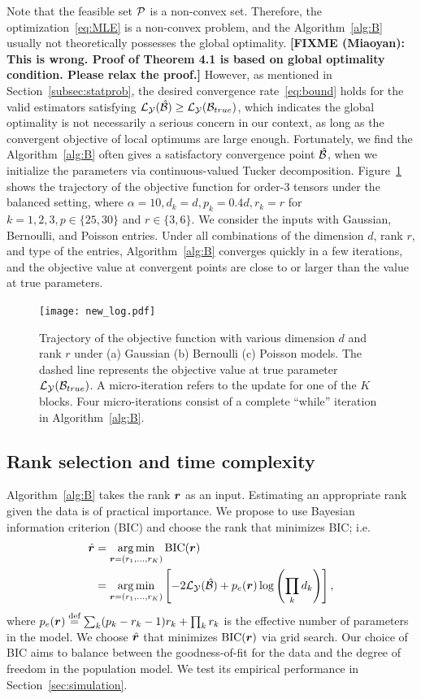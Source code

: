 \documentclass[12pt]{article}
\theoremstyle{plain}
\theoremstyle{definition}
\def\fixme#1#2{\textbf{\color{red}[FIXME (#1): #2]}}
\begin{document}
Note that the feasible set $\mathcal{P}$ is a non-convex set. Therefore, the optimization~\eqref{eq:MLE} is a non-convex problem, and the Algorithm~\ref{alg:B} usually not theoretically possesses the global optimality. \fixme{Miaoyan}{This is wrong. Proof of Theorem 4.1 is based on global optimality condition. Please relax the proof.} However, as mentioned in Section~\ref{subsec:statprob}, the desired convergence rate~\eqref{eq:bound} holds for the valid estimators satisfying $\mathcal{L}_{\mathcal{Y}} (\hat {\mathcal{B}}) \geq \mathcal{L}_{\mathcal{Y}} (\mathcal{B}_{true})$, which indicates the global optimality is not necessarily a serious concern in our context, as long as the convergent objective of local optimums are large enough. Fortunately, we find the  Algorithm~\ref{alg:B}  often gives a satisfactory convergence point $\hat {\mathcal{B}}$, when we initialize the parameters via continuous-valued Tucker decomposition. Figure~\ref{fig:loglike} shows the trajectory of the objective function for order-3 tensors under the balanced setting, where $\alpha = 10, d_k = d, p_k = 0.4d, r_k = r$ for $ k = 1,2,3, p \in \{25,30\}$  and $r \in \{3, 6\}$. We consider the inputs with Gaussian, Bernoulli, and Poisson entries. Under all combinations of the dimension $d$, rank $r$, and type of the entries, Algorithm~\ref{alg:B} converges quickly in a few iterations, and the objective value at convergent points are close to or larger than the value at true parameters.  


\begin{figure}[t]
\centering
\texttt{[image: new\_log.pdf]}
\caption{Trajectory of the objective function with various dimension $d$ and rank $r$ under (a) Gaussian (b) Bernoulli (c) Poisson models. The dashed line represents the objective value at true parameter $\mathcal{L}_{\mathcal{Y}}(\mathcal{B}_{true})$. A micro-iteration refers to the update for one of the $K$ blocks. Four micro-iterations consist of a complete ``while'' iteration in Algorithm~\ref{alg:B}.}\label{fig:loglike}
\end{figure}



\subsection{Rank selection and time complexity}\label{sec:tuning}
Algorithm~\ref{alg:B} takes the rank $\bm{r}$ as an input. Estimating an appropriate rank given the data is of practical importance. We propose to use Bayesian information criterion (BIC) and choose the rank that minimizes BIC; i.e.
\begin{align}\label{eq:BIC}
\hat {\bm{r}}&=\operatorname*{arg\,min}_{\bm{r}=(r_1,\ldots,r_K)} \text{BIC}(\bm{r})\\
&=\operatorname*{arg\,min}_{\bm{r}=(r_1,\ldots,r_K)}\left[-2\mathcal{L}_{\mathcal{Y}}(\hat {\mathcal{B}})+p_e(\bm{r})\log \left(\prod_k d_k\right) \right],
\end{align}
where $p_e(\bm{r})\stackrel{\text{def}}{=}\sum_k (p_k-r_k-1)r_k+\prod_k r_k$ is the effective number of parameters in the model. We choose $\hat {\bm{r}}$ that minimizes $\text{BIC}(\bm{r})$ via grid search. Our choice of BIC aims to balance between the goodness-of-fit for the data and the degree of freedom in the population model. We test its empirical performance in Section~\ref{sec:simulation}.  
\end{document}
